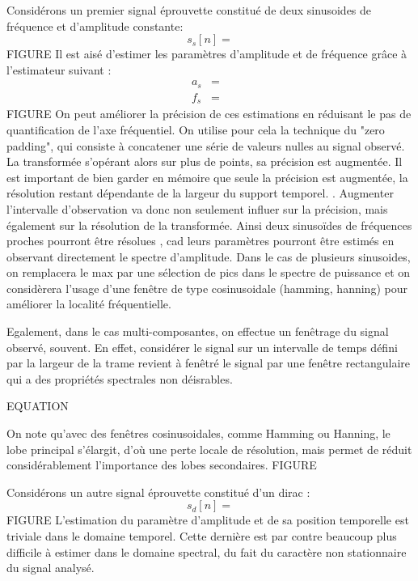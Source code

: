 Considérons un premier signal \og éprouvette \fg constitué de deux sinusoides de fréquence et d'amplitude constante:
\begin{equation}
  s_s[n] =
\end{equation} FIGURE
Il est aisé d'estimer les paramètres d'amplitude et de fréquence grâce à l'estimateur suivant :
\begin{eqnarray}
  a_s &=& \\
  f_s &=&
\end{eqnarray} FIGURE
On peut améliorer la précision de ces estimations en réduisant le pas de quantification de l'axe fréquentiel. On utilise pour cela la technique du "zero padding", qui consiste à concatener une série de valeurs nulles au signal observé. La transformée s'opérant alors sur plus de points, sa précision est augmentée. Il est important de bien garder en mémoire que seule la précision est augmentée, la résolution restant dépendante de la largeur du support temporel. . Augmenter l'intervalle d'observation va donc non seulement influer sur la précision, mais également sur la résolution de la transformée. Ainsi deux sinusoïdes de fréquences proches pourront être \og résolues \fg, cad leurs paramètres pourront être estimés en observant directement le spectre d'amplitude. Dans le cas de plusieurs sinusoides, on remplacera le max par une sélection de pics dans le spectre de puissance et on considèrera l'usage d'une fenêtre de type cosinusoidale (hamming, hanning) pour améliorer la localité fréquentielle.

Egalement, dans le cas multi-composantes, on effectue un fenêtrage du signal observé, souvent. En effet, considérer le signal sur un intervalle de temps défini par la largeur de la trame revient à fenêtré le signal par une fenêtre rectangulaire qui a des propriétés spectrales non déisrables.

EQUATION

On note qu'avec des fenêtres cosinusoidales, comme Hamming ou Hanning, le lobe principal s'élargit, d'où une perte locale de résolution, mais permet de réduit considérablement l'importance des lobes secondaires. FIGURE

Considérons un autre signal \og éprouvette \fg constitué d'un dirac :
\begin{equation}
  s_d[n] =
\end{equation} FIGURE
L'estimation du paramètre d'amplitude et de sa position temporelle est triviale dans le domaine temporel. Cette dernière est par contre beaucoup plus difficile à estimer dans le domaine spectral, du fait du caractère non stationnaire du signal analysé.

